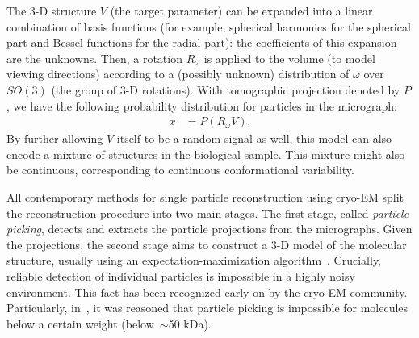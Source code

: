 \documentclass[12pt]{article}
\newcommand{\1}{\mathbf{1}}
\theoremstyle{plain}
\theoremstyle{definition}
\theoremstyle{remark}
\theoremstyle{plain}
\theoremstyle{remark}
\theoremstyle{plain}
\theoremstyle{plain}
\theoremstyle{plain}
\numberwithin{equation}{section}
\begin{document}
The 3-D structure $V$ (the target parameter) can be expanded into a linear combination of basis functions (for example, spherical harmonics for the spherical part and Bessel functions for the radial part): the coefficients of this expansion are the unknowns. Then, a rotation $R_\omega$ is applied to the volume (to model viewing directions) according to a (possibly unknown) distribution of $\omega$ over $SO(3)$ (the group of 3-D rotations). With tomographic projection denoted by $P$, we have the following probability distribution for particles in the micrograph:
\begin{align}
	x & = P(R_\omega V).
	\label{eq:cryoEM}
\end{align}
By further allowing $V$ itself to be a random signal as well, this model can also encode a mixture of structures in the biological sample. This mixture might also be continuous, corresponding to continuous conformational variability.

All contemporary methods for single particle reconstruction using cryo-EM  split the reconstruction procedure into two main  stages.
The first stage, called \emph{particle picking},  detects and extracts the particle projections from the micrographs. Given the projections, the second stage aims to construct a 3-D model of the molecular structure, usually using an expectation-maximization algorithm~\cite{scheres2012relion}. 
Crucially, reliable detection of individual particles is impossible in a highly noisy environment. This fact has been recognized early on by the cryo-EM community. 
Particularly, in~\cite{henderson1995limitations,glaeser1999electron}, it was reasoned that particle picking is impossible for molecules below a certain weight (below~$\sim$50 kDa). 
\end{document}
